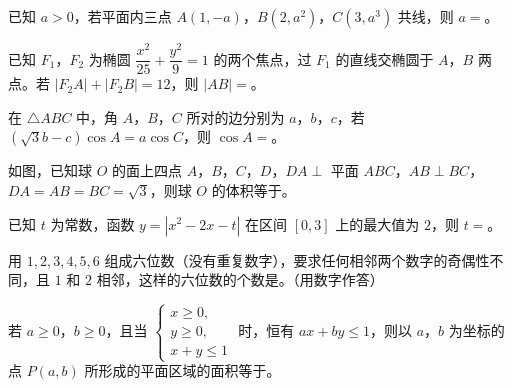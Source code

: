\begin{question}
已知 $a>0$，若平面内三点 $A(1,-a)$，$B(2,a^2)$，$C(3,a^3)$ 共线，则 $a=$\gkblank{}。

\end{question}
\begin{question}
已知 $F_1$，$F_2$ 为椭圆 $\dfrac{x^2}{25}+\dfrac{y^2}9=1$ 的两个焦点，过 $F_1$ 的直线交椭圆于 $A$，$B$ 两点。若 $|F_2A|+|F_2B|=12$，则 $|AB|=$\gkblank{}。

\end{question}
\begingroup
\renewenvironment{question}{\Needspace{0.46\textheight}}{}
\begin{question}
在 $\triangle ABC$ 中，角 $A$，$B$，$C$ 所对的边分别为 $a$，$b$，$c$，若 $(\sqrt3b-c)\cos A=a\cos C$，则 $\cos A=$\gkblank{}。

\Needspace{0.4\textheight}
\end{question}
\endgroup
\begin{question}
如图，已知球 $O$ 的面上四点 $A$，$B$，$C$，$D$，$DA\perp$ 平面 $ABC$，$AB\perp BC$，$DA=AB=BC=\sqrt3$，则球 $O$ 的体积等于\gkblank{}。
\nopagebreak[4]
\begin{center}\end{center}
\nopagebreak[4]
\end{question}
\begin{question}
已知 $t$ 为常数，函数 $y=\left|x^2-2x-t\right|$ 在区间 $[0,3]$ 上的最大值为 $2$，则 $t=$\gkblank{}。

\end{question}
\begingroup
\renewenvironment{question}{\Needspace{0.46\textheight}}{}
\begin{question}
用 $1,2,3,4,5,6$ 组成六位数（没有重复数字），要求任何相邻两个数字的奇偶性不同，且 $1$ 和 $2$ 相邻，这样的六位数的个数是\gkblank{}。（用数字作答）

\end{question}
\endgroup
\begin{question}
若 $a\geqslant0$，$b\geqslant0$，且当 $\begin{cases}x\geqslant0,\\ y\geqslant0,\\ x+y\leqslant1\end{cases}$ 时，恒有 $ax+by\leqslant1$，则以 $a$，$b$ 为坐标的点 $P(a,b)$ 所形成的平面区域的面积等于\gkblank{}。

\end{question}

